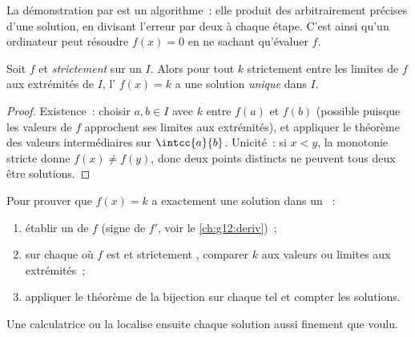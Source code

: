 \begin{remark}
La démonstration par  est un algorithme~: elle produit des
 arbitrairement précises d'une solution, en divisant l'erreur
par deux à chaque étape. C'est ainsi qu'un ordinateur peut résoudre
$f(x) = 0$ en ne sachant qu'évaluer $f$.
\end{remark}

\begin{theorem}\label{thm:g12:limcont:bijection}
Soit $f$  et \emph{strictement } sur un  $I$.
Alors pour tout $k$ strictement entre les limites de $f$ aux extrémités de
$I$, l' $f(x) = k$ a une solution \emph{unique} dans $I$.
\end{theorem}

\begin{proof}
Existence~: choisir $a, b \in I$ avec $k$ entre $f(a)$ et $f(b)$ (possible
puisque les valeurs de $f$ approchent ses limites aux extrémités), et
appliquer le théorème des valeurs intermédiaires sur $\intcc{a}{b}$.
Unicité~: si $x < y$, la monotonie stricte donne $f(x) \neq f(y)$, donc
deux points distincts ne peuvent tous deux être solutions.
\end{proof}

\begin{method}[Résoudre $f(x) = k$ avec le théorème de la bijection]\label{met:g12:limcont:bijection}
Pour prouver que $f(x) = k$ a exactement une solution dans un ~:
\begin{enumerate}
  \item établir un  de $f$ (signe de $f'$, voir le
        \cref{ch:g12:deriv})~;
  \item sur chaque  où $f$ est  et strictement ,
        comparer $k$ aux valeurs ou limites aux extrémités~;
  \item appliquer le théorème de la bijection sur chaque tel  et
        compter les solutions.
\end{enumerate}
Une calculatrice ou la  localise ensuite chaque solution aussi
finement que voulu.
\end{method}

